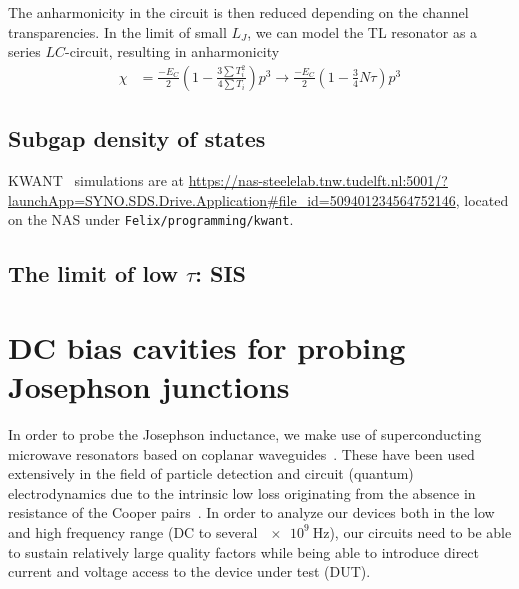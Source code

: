 The anharmonicity in the circuit is then reduced depending on the channel transparencies.
In the limit of small $L_J$, we can model the TL resonator as a series $LC$-circuit, resulting in anharmonicity
\begin{align}
\chi &= \frac{-E_C}{2} \left( 1-\frac{3\sum T_i^2}{4\sum T_i} \right) p^3 \rightarrow \frac{-E_C}{2} \left(1-\frac{3}{4}N\tau \right) p^3 
\end{align}


\subsection{Subgap density of states}

KWANT~\cite{grothKwantSoftwarePackage2014} simulations are at \url{https://nas-steelelab.tnw.tudelft.nl:5001/?launchApp=SYNO.SDS.Drive.Application#file_id=509401234564752146}, located on the NAS under \texttt{Felix/programming/kwant}.

\subsection{The limit of low $\tau$: SIS}



\section{DC bias cavities for probing Josephson junctions}



In order to probe the Josephson inductance, we make use of superconducting microwave resonators based on coplanar waveguides~\cite{gopplCoplanarWaveguideResonators2008,zmuidzinasSuperconductingMicroresonatorsPhysics2012}.
%
These have been used extensively in the field of particle detection and circuit (quantum) electrodynamics due to the intrinsic low loss originating from the absence in resistance of the Cooper pairs~\cite{dayBroadbandSuperconductingDetector2003a,blaisCavityQuantumElectrodynamics2004c}.
%
In order to analyze our devices both in the low and high frequency range (DC to several $\SI{e9}{\hertz}$), our circuits need to be able to sustain relatively large quality factors while being able to introduce direct current and voltage access to the device under test (DUT).

